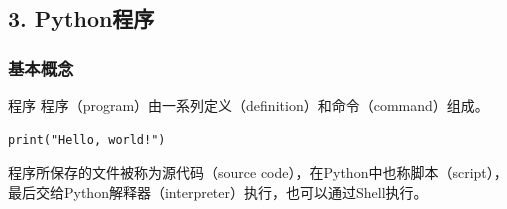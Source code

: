 \documentclass[aspectratio=169, 14pt]{beamer}
\begin{document}
{
\begin{frame}
	\section{\textcolor{darkmidnightblue}{3. Python程序}}
\end{frame}
}

\begin{frame}[fragile]
	\frametitle{基本概念}
	\begin{exampleblock}{程序}
		程序（program）由一系列定义（definition）和命令（command）组成。
	\end{exampleblock}

	\begin{verbatim}
print("Hello, world!")
  \end{verbatim}

	程序所保存的文件被称为\alert{源代码}（source code），在Python中也称\alert{脚本}（script），最后交给Python\alert{解释器}（interpreter）执行，也可以通过Shell执行。
\end{frame}
\end{document}
